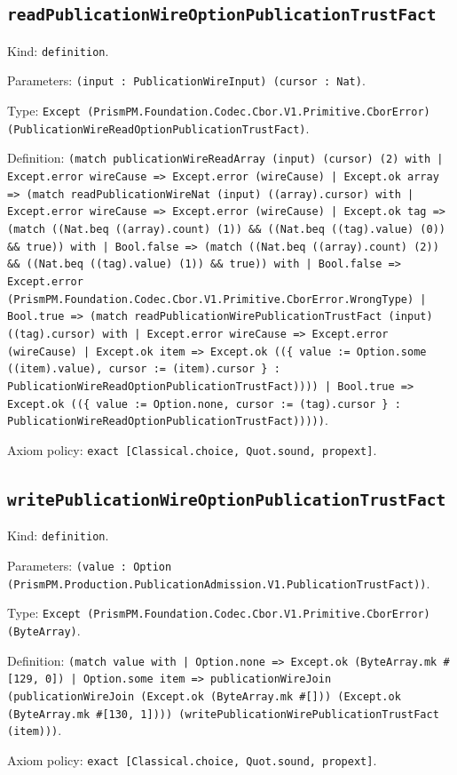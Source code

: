 \documentclass[11pt]{article}
\begin{document}
\subsection*{\texttt{readPublicationWireOptionPublicationTrustFact}}
\noindent Kind: \texttt{definition}.\par
\noindent Parameters: \texttt{(input : PublicationWireInput) (cursor : Nat)}.\par
\noindent Type: \texttt{Except (PrismPM.Foundation.Codec.Cbor.V1.Primitive.CborError) (PublicationWireReadOptionPublicationTrustFact)}.\par
\noindent Definition: \texttt{(match publicationWireReadArray (input) (cursor) (2) with | Except.error wireCause => Except.error (wireCause) | Except.ok array => (match readPublicationWireNat (input) ((array).cursor) with | Except.error wireCause => Except.error (wireCause) | Except.ok tag => (match ((Nat.beq ((array).count) (1)) \&\& ((Nat.beq ((tag).value) (0)) \&\& true)) with | Bool.false => (match ((Nat.beq ((array).count) (2)) \&\& ((Nat.beq ((tag).value) (1)) \&\& true)) with | Bool.false => Except.error (PrismPM.Foundation.Codec.Cbor.V1.Primitive.CborError.WrongType) | Bool.true => (match readPublicationWirePublicationTrustFact (input) ((tag).cursor) with | Except.error wireCause => Except.error (wireCause) | Except.ok item => Except.ok ((\{ value := Option.some ((item).value), cursor := (item).cursor \} : PublicationWireReadOptionPublicationTrustFact)))) | Bool.true => Except.ok ((\{ value := Option.none, cursor := (tag).cursor \} : PublicationWireReadOptionPublicationTrustFact)))))}.\par
\noindent Axiom policy: \texttt{exact [Classical.choice, Quot.sound, propext]}.\par
\subsection*{\texttt{writePublicationWireOptionPublicationTrustFact}}
\noindent Kind: \texttt{definition}.\par
\noindent Parameters: \texttt{(value : Option (PrismPM.Production.PublicationAdmission.V1.PublicationTrustFact))}.\par
\noindent Type: \texttt{Except (PrismPM.Foundation.Codec.Cbor.V1.Primitive.CborError) (ByteArray)}.\par
\noindent Definition: \texttt{(match value with | Option.none => Except.ok (ByteArray.mk \#[129, 0]) | Option.some item => publicationWireJoin (publicationWireJoin (Except.ok (ByteArray.mk \#[])) (Except.ok (ByteArray.mk \#[130, 1]))) (writePublicationWirePublicationTrustFact (item)))}.\par
\noindent Axiom policy: \texttt{exact [Classical.choice, Quot.sound, propext]}.\par
\end{document}
